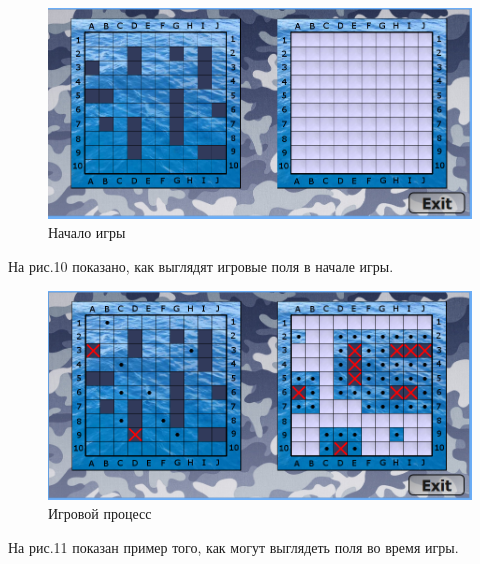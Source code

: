 \documentclass[a4paper]{article}
\begin{document}
\begin{figure}[H]
	\begin{center}
		\includegraphics[scale=0.5]{screen/GUI_start.png}
		\caption{Начало игры} 
		\label{pic:pic_name} %
	\end{center}
\end{figure}

На рис.10 показано, как выглядят игровые поля в начале игры.

\begin{figure}[H]
	\begin{center}
		\includegraphics[scale=0.5]{screen/GUI_game_process.png}
		\caption{Игровой процесс} 
		\label{pic:pic_name} %
	\end{center}
\end{figure}

На рис.11 показан пример того, как могут выглядеть поля во время игры.
\end{document}
